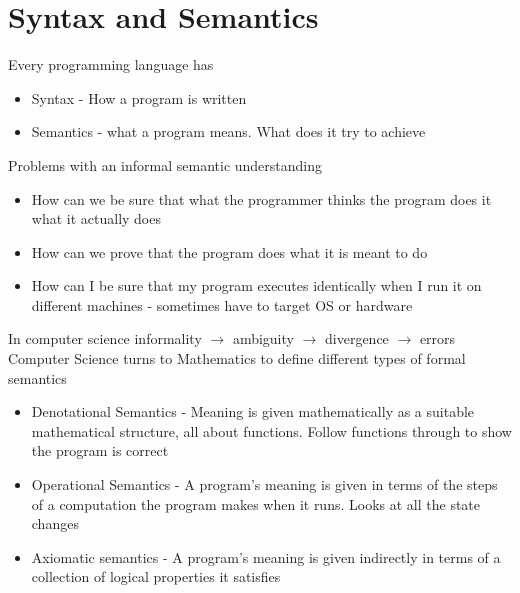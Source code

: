 \documentclass{article}[18pt]
\begin{document}
\section{Syntax and Semantics}
Every programming language has 
\begin{itemize}
\item Syntax - How a program is written
\item Semantics - what a program means. What does it try to achieve
\end{itemize}
Problems with an informal semantic understanding
\begin{itemize}
\item How can we be sure that what the programmer thinks the program does it what it actually does
\item How can we prove that the program does what it is meant to do
\item How can I be sure that my program executes identically when I run it on different machines - sometimes have to target OS or hardware
\end{itemize}
In computer science informality $\rightarrow$ ambiguity $\rightarrow$ divergence $\rightarrow$ errors\\
Computer Science turns to Mathematics to define different types of formal semantics 
\begin{itemize}
\item Denotational Semantics - Meaning is given mathematically as a suitable mathematical structure, all about functions. Follow functions through to show the program is correct
\item Operational Semantics - A program's meaning is given in terms of the steps of a computation the program makes when it runs. Looks at all the state changes
\item Axiomatic semantics - A program's meaning is given indirectly in terms of a collection of logical properties it satisfies
\end{itemize}
\end{document}
